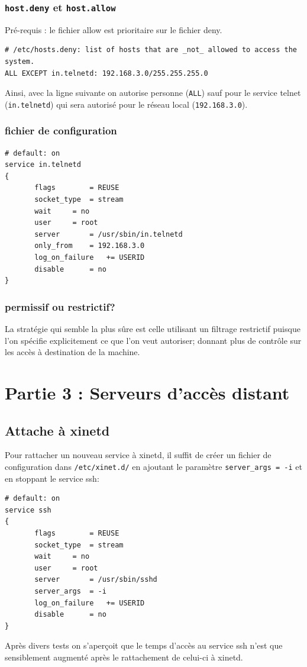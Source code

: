 \documentclass[12pt,a4paper,notitlepage]{article}
\begin{document}
\subsubsection{\texttt{host.deny} et \texttt{host.allow}}

\noindent Pré-requis : le fichier allow est prioritaire sur le fichier deny.\\

\begin{lstlisting}
# /etc/hosts.deny: list of hosts that are _not_ allowed to access the system.
ALL EXCEPT in.telnetd: 192.168.3.0/255.255.255.0
\end{lstlisting}
Ainsi, avec la ligne suivante on autorise personne (\texttt{ALL}) sauf pour le service telnet (\texttt{in.telnetd}) qui sera autorisé pour le réseau local (\texttt{192.168.3.0}).


\subsubsection{fichier de configuration}

\begin{lstlisting}
# default: on
service in.telnetd
{
       flags		= REUSE
       socket_type	= stream
       wait		= no
       user		= root
       server		= /usr/sbin/in.telnetd
       only_from	= 192.168.3.0
       log_on_failure	+= USERID
       disable		= no
}
\end{lstlisting}

\subsubsection{permissif ou restrictif?}



La stratégie qui semble la plus sûre est celle utilisant un filtrage restrictif puisque l'on spécifie explicitement ce que l'on veut autoriser; donnant plus de contrôle sur les accès à destination de la machine.


\section{Partie 3 : Serveurs d'accès distant}

\subsection{Attache à xinetd}

Pour rattacher un nouveau service à xinetd, il suffit de créer un fichier de configuration dans \texttt{/etc/xinet.d/} en ajoutant le paramètre \texttt{server\_args = -i} et en stoppant le service ssh: \\

\begin{lstlisting}
# default: on
service ssh
{
       flags		= REUSE
       socket_type	= stream
       wait		= no
       user		= root
       server		= /usr/sbin/sshd
       server_args	= -i
       log_on_failure	+= USERID
       disable		= no
}
\end{lstlisting}

Après divers tests on s'aperçoit que le temps d'accès au service ssh n'est que sensiblement augmenté après le rattachement de celui-ci à xinetd.
\end{document}
